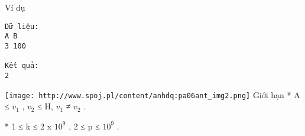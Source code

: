 Ví dụ
\begin{verbatim}
Dữ liệu:
A B
3 100

Kết quả:
2
\end{verbatim}


\texttt{[image: http://www.spoj.pl/content/anhdq:pa06ant\_img2.png]}
Giới hạn
* A ≤ $v_{1}$   , $v_{2}$   ≤ H, $v_{1}$   ≠ $v_{2}$   .   


   * 1 ≤ k ≤ 2 x $10^{9}$   , 2 ≤ p ≤ $10^{9}$   .